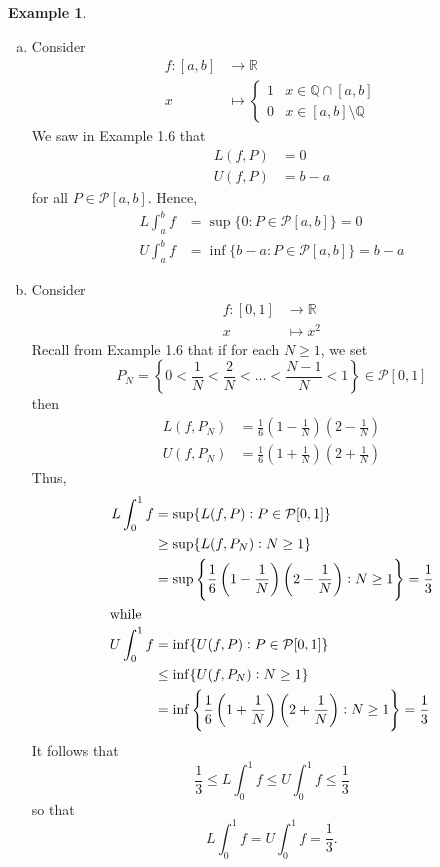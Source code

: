 \documentclass[11pt]{article}
\theoremstyle{definition}
\newtheorem{exmp}[thm]{Example}
\newcommand{\mbQ}{\ensuremath{\mathbb{Q}}}
\newcommand{\mbR}{\ensuremath{\mathbb{R}}}
\begin{document}
\begin{exmp}~ \vspace{-0.2cm}
\begin{enumerate}[(a)]

\item Consider
\begin{align*}
f : [a, b] & \to \mbR \\
          x & \mapsto \begin{cases}
          				1 & x \in \mbQ \cap [a, b] \\
          				0 & x \in [a, b] \setminus \mbQ
				   \end{cases}
\end{align*}
We saw in Example 1.6 that
\begin{align*}
L(f, P) & = 0 \\
U(f, P) & = b - a
\end{align*}
for all $P \in \mathcal{P}[a, b]$. Hence,
\begin{align*}
L\int_a^b f & = \sup\{0 : P \in \mathcal{P}[a, b]\} = 0 \\
U\int_a^b f & = \inf\{b-a : P \in \mathcal{P}[a, b]\} = b-a
\end{align*}

\item Consider
\begin{align*}
f : [0, 1] & \to \mbR \\
	    x & \mapsto x^2
\end{align*}
Recall from Example 1.6 that if for each $N \geq 1$, we set
$$P_N = \left\{0 < \frac1N < \frac2N < \hdots < \frac{N-1}N < 1 \right\} \in \mathcal{P}[0, 1]$$
then
\begin{align*}
L(f, P_N) & = \frac16\left(1 - \frac1N\right)\left(2 - \frac1N\right) \\
U(f, P_N) & = \frac16\left(1 + \frac1N\right)\left(2 + \frac1N\right)
\end{align*}
Thus,
\begin{align*}
L\int_0^1 f & = \sup\{L(f, P) : P \in \mathcal{P}[0, 1]\} \\
		    & \geq \sup\{L(f, P_N) : N \geq 1\} \\
		    & = \sup\left\{\frac16\left(1-\frac1N\right)\left(2-\frac1N\right) : N \geq 1\right\} = \frac13 \\
\intertext{while}
U\int_0^1 f & = \inf\{U(f, P) : P \in \mathcal{P}[0, 1]\} \\
		     & \leq \inf\{U(f, P_N) : N \geq 1\} \\
		     & = \inf\left\{\frac16\left(1+\frac1N\right)\left(2+\frac1N\right) : N \geq 1\right\} = \frac13 
\end{align*}
It follows that
$$\frac13 \leq L\int_0^1 f \leq U\int_0^1 f \leq \frac13$$
so that
$$L\int_0^1 f = U\int_0^1 f = \frac13 \text{.}$$

\end{enumerate}
\end{exmp}
\end{document}
